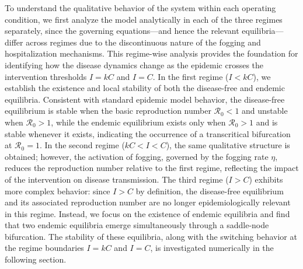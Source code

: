 \documentclass[preprint]{elsarticle}
\begin{document}
To understand the qualitative behavior of the system within each operating condition, we first analyze the model analytically in each of the three regimes separately, since the governing equations---and hence the relevant equilibria---differ across regimes due to the discontinuous nature of the fogging and hospitalization mechanisms. This regime-wise analysis provides the foundation for identifying how the disease dynamics change as the epidemic crosses the intervention thresholds $I=kC$ and $I=C$. In the first regime ($I<kC$), we establish the existence and local stability of both the disease-free and endemic equilibria. Consistent with standard epidemic model behavior, the disease-free equilibrium is stable when the basic reproduction number $\mathcal{R}_0<1$ and unstable when $\mathcal{R}_0>1$, while the endemic equilibrium exists only when $\mathcal{R}_0>1$ and is stable whenever it exists, indicating the occurrence of a transcritical bifurcation at $\mathcal{R}_0=1$. In the second regime ($kC<I<C$), the same qualitative structure is obtained; however, the activation of fogging, governed by the fogging rate $\eta$, reduces the reproduction number relative to the first regime, reflecting the impact of the intervention on disease transmission. The third regime ($I>C$) exhibits more complex behavior: since $I>C$ by definition, the disease-free equilibrium and its associated reproduction number are no longer epidemiologically relevant in this regime. Instead, we focus on the existence of endemic equilibria and find that two endemic equilibria emerge simultaneously through a saddle-node bifurcation. The stability of these equilibria, along with the switching behavior at the regime boundaries $I=kC$ and $I=C$, is investigated numerically in the following section.
\end{document}
